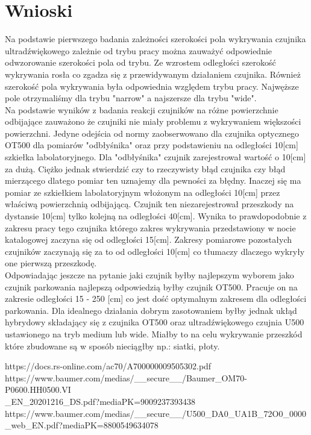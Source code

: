 \documentclass[11pt]{article}
\begin{document}
    \section{Wnioski}
    \par Na podstawie pierwszego badania zależności szerokości pola wykrywania czujnika ultradźwiękowego zależnie od trybu
    pracy można zauważyć odpowiednie odwzorowanie szerokości pola od trybu. Ze wzrostem odległości szerokość wykrywania
    rosła co zgadza się z przewidywanym działaniem czujnika. Również szerokość pola wykrywania była odpowiednia względem
    trybu pracy. Najwęższe pole otrzymaliśmy dla trybu "narrow" a najszersze dla trybu "wide".\\
    \indent Na podstawie wyników z badania reakcji czujników na różne powierzchnie odbijające zauważono że czujniki nie miały problemu
    z wykrywaniem większości powierzchni. Jedyne odejścia od normy zaobserwowano dla czujnika optycznego OT500 dla pomiarów "odbłyśnika" oraz
    przy podstawieniu na odległości 10[cm] szkiełka labolatoryjnego. Dla "odbłyśnika" czujnik zarejestrował wartość o 10[cm] za dużą. Ciężko jednak
    stwierdzić czy to rzeczywisty błąd czujnika czy błąd mierzącego dlatego pomiar ten uznajemy dla pewności za błędny. Inaczej się ma pomiar
    ze szkiełkiem labolatoryjnym włożonym na odległości 10[cm] przez właściwą powierzchnią odbijającą. Czujnik ten niezarejestrował przeszkody
    na dystansie 10[cm] tylko kolejną na odległości 40[cm]. Wynika to prawdopodobnie z zakresu pracy tego czujnika którego zakres wykrywania
    przedstawiony w nocie katalogowej zaczyna się od odległości 15[cm]. Zakresy pomiarowe pozostałych czujników zaczynają się za to od odległości
    10[cm] co tłumaczy dlaczego wykryły one pierwszą przeszkodę.\\
    \indent Odpowiadając jeszcze na pytanie jaki czujnik byłby najlepszym wyborem jako czujnik parkowania najlepszą odpowiedzią byłby czujnik
    OT500. Pracuje on na zakresie odległości 15 - 250 [cm] co jest dość optymalnym zakresem dla odległości parkowania. Dla idealnego działania
    dobrym zasotowaniem byłby jednak ukłąd hybrydowy składający się z czujnika OT500 oraz ultradźwiękowego czujnia U500 ustawionego na tryb medium lub
    wide. Miałby to na celu wykrywanie przeszkód które zbudowane są w sposób nieciągłby np.: siatki, płoty.



    \vfill
    \footnotesize
    \begin{thebibliography}{3}
        https://docs.rs-online.com/ac70/A700000009505302.pdf
        https://www.baumer.com/medias/\_\_secure\_\_/Baumer\_OM70-P0600.HH0500.VI\\ \_EN\_20201216\_DS.pdf?mediaPK=9009237393438
        https://www.baumer.com/medias/\_\_secure\_\_/U500\_DA0\_UA1B\_72O0\_0000\_web\_EN.pdf?mediaPK=8800549634078
    \end{thebibliography}
\end{document}
